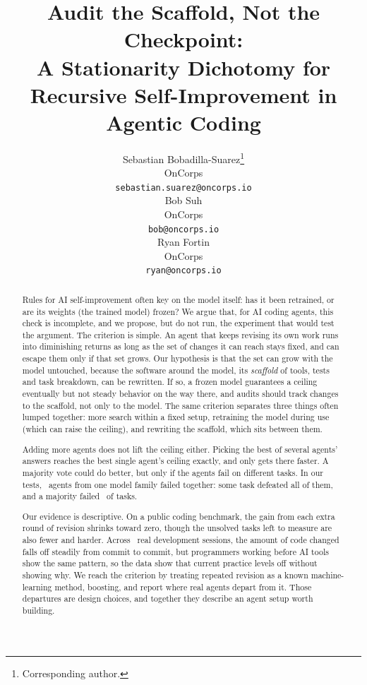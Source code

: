 \documentclass{article}
\title{Audit the Scaffold, Not the Checkpoint:\\
A Stationarity Dichotomy for Recursive Self-Improvement in Agentic Coding}
\author{
  Sebastian Bobadilla-Suarez\thanks{Corresponding author.} \\
  OnCorps \\
  \texttt{sebastian.suarez@oncorps.io} \\
  \And
  Bob Suh \\
  OnCorps \\
  \texttt{bob@oncorps.io} \\
  \And
  Ryan Fortin \\
  OnCorps \\
  \texttt{ryan@oncorps.io} \\
}
\theoremstyle{remark}
\theoremstyle{plain}
\begin{document}
\maketitle

\begin{abstract}
Rules for AI self-improvement often key on the model itself: has it been retrained, or are its weights (the trained model) frozen? We argue that, for AI coding agents, this check is incomplete, and we propose, but do not run, the experiment that would test the argument. The criterion is simple. An agent that keeps revising its own work runs into diminishing returns as long as the set of changes it can reach stays fixed, and can escape them only if that set grows. Our hypothesis is that the set can grow with the model untouched, because the software around the model, its \emph{scaffold} of tools, tests and task breakdown, can be rewritten. If so, a frozen model guarantees a ceiling eventually but not steady behavior on the way there, and audits should track changes to the scaffold, not only to the model. The same criterion separates three things often lumped together: more search within a fixed setup, retraining the model during use (which can raise the ceiling), and rewriting the scaffold, which sits between them.

Adding more agents does not lift the ceiling either. Picking the best of several agents' answers reaches the best single agent's ceiling exactly, and only gets there faster. A majority vote could do better, but only if the agents fail on different tasks. In our tests, \statPBOverlapK\ agents from one model family failed together: some task defeated all of them, and a majority failed \statPBOverlapViolate\ of tasks.

Our evidence is descriptive. On a public coding benchmark, the gain from each extra round of revision shrinks toward zero, though the unsolved tasks left to measure are also fewer and harder. Across \statPCSessions\ real development sessions, the amount of code changed falls off steadily from commit to commit, but programmers working before AI tools show the same pattern, so the data show that current practice levels off without showing why. We reach the criterion by treating repeated revision as a known machine-learning method, boosting, and report where real agents depart from it. Those departures are design choices, and together they describe an agent setup worth building.
\end{abstract}

\end{document}
